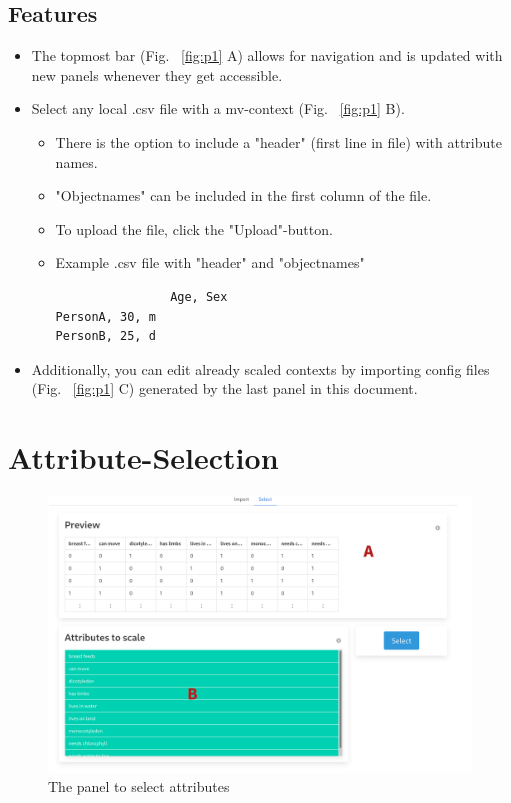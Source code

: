 \documentclass[]{report}
\begin{document}
\subsection{Features}
\begin{itemize}
    \item The topmost bar (Fig. ~\ref{fig:p1} A) allows for navigation and is updated with new panels whenever they get accessible.
	\item Select any local .csv file with a mv-context (Fig. ~\ref{fig:p1} B).
    \begin{itemize}
        \item There is the option to include a "header" (first line in file) with attribute names.
        \item "Objectnames" can be included in the first column of the file.
        \item To upload the file, click the "Upload"-button.
		\item Example .csv file with "header" and "objectnames"
		\begin{lstlisting}
				Age, Sex
PersonA, 30, m
PersonB, 25, d\end{lstlisting}
    \end{itemize}
    \item Additionally, you can edit already scaled contexts by importing config files (Fig. ~\ref{fig:p1} C) generated by the last panel in this document.
\end{itemize}

\section{Attribute-Selection}
\begin{figure}[H]
	\includegraphics[width=\linewidth]{final_presentation/images/selection.png}
	\caption{The panel to select attributes}
	\label{fig:p2}
\end{figure}
\end{document}
